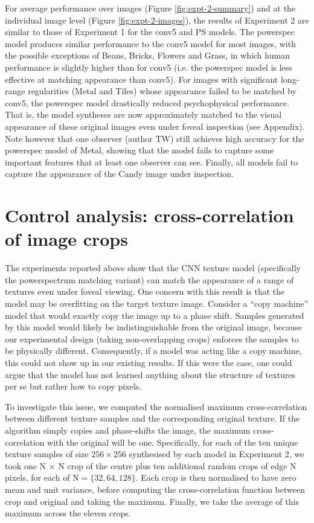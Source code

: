 \documentclass[doc, 11pt,a4paper,natbib]{apa6}\usepackage[]{graphicx}\usepackage[]{color}
\begin{document}
For average performance over images (Figure \ref{fig:expt-2-summary}) and at the individual image level (Figure \ref{fig:expt-2-images}), the results of Experiment 2 are similar to those of Experiment 1 for the conv5 and PS models.
The powerspec model produces similar performance to the conv5 model for most images, with the possible exceptions of Beans, Bricks, Flowers and Grass, in which human performance is slightly higher than for conv5 (i.e. the powerspec model is less effective at matching appearance than conv5). 
For images with significant long-range regularities (Metal and Tiles) whose appearance failed to be matched by conv5, the powerspec model drastically reduced psychophysical performance.
That is, the model syntheses are now approximately matched to the visual appearance of these original images even under foveal inspection (see Appendix).
Note however that one observer (author TW) still achieves high accuracy for the powerspec model of Metal, showing that the model fails to capture some important features that at least one observer can see.
Finally, all models fail to capture the appearance of the Candy image under inspection.

\section{Control analysis: cross-correlation of image crops}

The experiments reported above show that the CNN texture model (specifically the powerspectrum matching variant) can match the appearance of a range of textures even under foveal viewing.
One concern with this result is that the model may be overfitting on the target texture image.
Consider a ``copy machine'' model that would exactly copy the image up to a phase shift.
Samples generated by this model would likely be indistinguishable from the original image, because our experimental design (taking non-overlapping crops) enforces the samples to be physically different. 
Consequently, if a model was acting like a copy machine, this could not show up in our existing results.
If this were the case, one could argue that the model has not learned anything about the structure of textures per se but rather how to copy pixels.

To investigate this issue, we computed the normalised maximum cross-correlation between different texture samples and the corresponding original texture. 
If the algorithm simply copies and phase-shifts the image, the maximum cross-correlation with the original will be one.
Specifically, for each of the ten unique texture samples of size $256 \times 256$ synthesised by each model in Experiment 2, we took 
one N $\times$ N crop of the centre plus ten additional random crops of edge N pixels, for each of $\mathrm{N} = \{32, 64, 128\}$.
Each crop is then normalised to have zero mean and unit variance, before computing the cross-correlation function between crop and original and taking the maximum.
Finally, we take the average of this maximum across the eleven crops.
\end{document}

